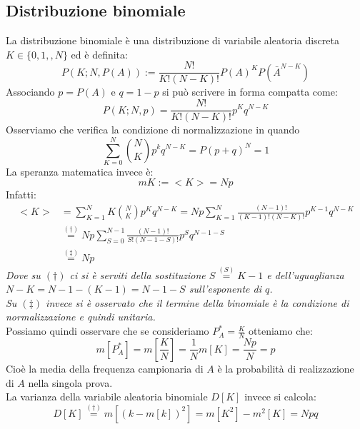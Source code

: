 \documentclass[11pt,a4paper]{book}
\begin{document}
\subsection{Distribuzione binomiale} 
La distribuzione binomiale è una distribuzione di variabile aleatoria discreta $ K \in \{0,1,,N\}$ ed è definita:
\begin{equation}
P(K;N,P(A)) := \frac{N!}{K!(N-K)!}P(A)^K P(\bar{A}^{N-K})
\end{equation}
Associando $ p = P(A) $ e $ q = 1-p $ si può scrivere in forma compatta come:
\begin{equation}
P(K;N,p) = \frac{N!}{K!(N-K)!}p^K q^{N-K}
\end{equation}
Osserviamo che verifica la condizione di normalizzazione in quando
\begin{equation}
\sum\limits_{K = 0}^{N}\binom{N}{K}p^kq^{N-K}=P(p+q)^N=1
\end{equation}
La speranza matematica invece è:
\begin{equation}
m{K} := <K> = Np
\end{equation}
Infatti:
\begin{align}
<K> &= \sum\limits_{K = 1}^{N}K\binom{N}{K}p^Kq^{N-K} = Np \sum\limits_{K = 1}^{N} \frac{(N-1)!}{(K-1)!(N-K)!}p^{K-1}q^{N-K} \\
& \stackrel{(\dag)}{=}Np \sum\limits_{S = 0}^{N-1}\frac{(N-1)!}{S!(N-1-S)!}p^Sq^{N-1-S} \\
& \stackrel{(\ddag)}{=} Np
\end{align}
\textit{Dove su $ (\dag) $ ci si è serviti della sostituzione $ S  \stackrel{(S)}{=} K-1 $ e dell'uguaglianza $ N-K = N-1-(K-1)=N-1-S $ sull'esponente di $ q $. \\Su $( \ddag) $ invece si è osservato che il termine della binomiale è la condizione di normalizzazione e quindi unitaria.}\\
Possiamo quindi osservare che se consideriamo $ P_A^* = \frac{K}{N} $ otteniamo che:
\begin{equation}
m[P_A^*]= m \left[ \frac{K}{N}\right]  = \frac{1}{N}m[K] = \frac{Np}{N}=p
\end{equation}
Cioè la media della frequenza campionaria di $ A $ è la probabilità di realizzazione di $ A $ nella singola prova.\\
La varianza della variabile aleatoria binomiale $ D[K]$ invece si calcola:
\begin{equation}
D[K] \stackrel{(\dag)}{=} m[(k-m[k])^2]=m[K^2]-m^2[K] = Npq
\end{equation}
\end{document}
